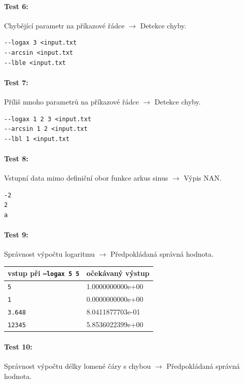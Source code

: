 \documentclass[12pt,a4paper,titlepage,final]{article}
\begin{document}
\paragraph{Test 6:} Chybějící parametr na příkazové řádce $\longrightarrow$ Detekce
chyby.
\begin{verbatim}
--logax 3 <input.txt
--arcsin <input.txt
--lble <input.txt
\end{verbatim}

\paragraph{Test 7:} Příliš mnoho parametrů na příkazové řádce
$\longrightarrow$ Detekce chyby.
\begin{verbatim}
--logax 1 2 3 <input.txt
--arcsin 1 2 <input.txt
--lbl 1 <input.txt
\end{verbatim}

\paragraph{Test 8:} Vstupní data mimo definiční obor funkce arkus sinus
$\longrightarrow$ Výpis NAN.
\begin{verbatim}
-2
2
a
\end{verbatim}

\paragraph{Test 9:} Správnost výpočtu logaritmu $\longrightarrow$
Předpokládaná správná hodnota.

\vspace{1em}\begin{tabular}{ll} %
vstup při \texttt{--logax 5 5} & očekávaný výstup \\
\hline
\verb|5| & 1.0000000000e+00 \\
\verb|1| & 0.0000000000e+00 \\
\verb|3.648| & 8.0411877703e-01 \\
\verb|12345| & 5.8536022399e+00 \\
\end{tabular}

\paragraph{Test 10:} Správnost výpočtu délky lomené čáry s chybou
$\longrightarrow$ Předpokládaná správná hodnota.
\end{document}
